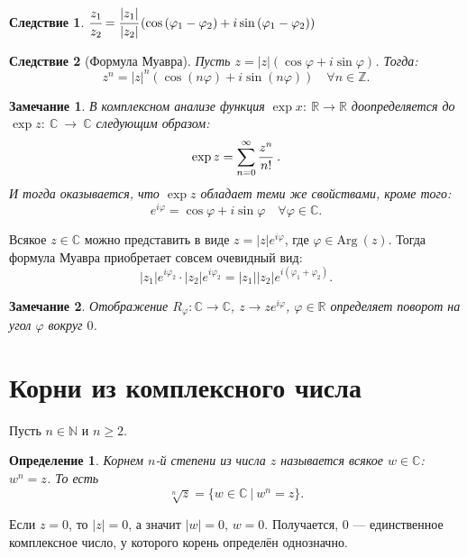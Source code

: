 \documentclass[a4paper,12pt]{article}
\newtheorem*{Def}{Определение}
\newtheorem*{Comment}{Замечание}
\newtheorem*{Consequence}{Следствие}
\newcommand{\Arg}{\mathrm{Arg\:}}
\begin{document}
\begin{Consequence}
$\cfrac{z_1}{z_2} = \cfrac{|z_1|}{|z_2|}\left(\cos\left(\varphi_1-\varphi_2\right) + i\sin\left(\varphi_1 - \varphi_2\right)\right)$
\end{Consequence}

\begin{Consequence}[Формула Муавра]
Пусть $z = |z|\left(\cos\varphi + i \sin \varphi\right)$. Тогда:
\[z^n = |z|^n\left(\cos\left(n\varphi\right)+i\sin\left(n\varphi\right)\right) \quad \forall n \in \mathbb{Z}.
\]
\end{Consequence}

\begin{Comment}
В комплексном анализе функция $\exp x\colon\ \mathbb{R} \rightarrow \mathbb{R}$ доопределяется до $\exp z\colon \ \mathbb{C}~\rightarrow~\mathbb{C}$ следующим образом:
\[
\exp z =\sum\limits_{n=0}^{\infty}\cfrac{z^n}{n!}\ .
\]
И тогда оказывается, что $\exp z$ обладает теми же свойствами, кроме того:
\[
e^{i\varphi} = \cos\varphi + i\sin\varphi \quad \forall \varphi \in \mathbb{C}.
\]
\end{Comment}

Всякое $z \in \mathbb{C}$ можно представить в виде $z = |z|e^{i\varphi}$, где $\varphi \in \Arg\left(z\right)$. Тогда формула Муавра приобретает совсем очевидный вид:
\[
|z_1|e^{i\varphi_2}\cdot|z_2|e^{i\varphi_2} = |z_1||z_2|e^{i\left(\varphi_1+\varphi_2\right)}.
\]

\begin{Comment}
Отображение $R_\varphi \colon \mathbb{C}\rightarrow\mathbb{C}$, $z\rightarrow ze^{i\varphi}$, $\varphi \in \mathbb{R}$ определяет поворот на угол $\varphi$ вокруг $0$.
\end{Comment}

\section*{Корни из комплексного числа}

Пусть $n\in\mathbb N$ и $n\geqslant2$.

\begin{Def}
Корнем $n$-й степени из числа $z$ называется всякое $w\in\mathbb C$: $w^n=z$. То есть
\[
\sqrt[n]{z} = \{w\in\mathbb C\ |\ w^n = z\}.
\]
\end{Def}

Если $z=0$, то $|z| = 0$, а значит $|w| = 0$, $w=0$. Получается, 0 --- единственное комплексное число, у которого корень определён однозначно. 
\end{document}
